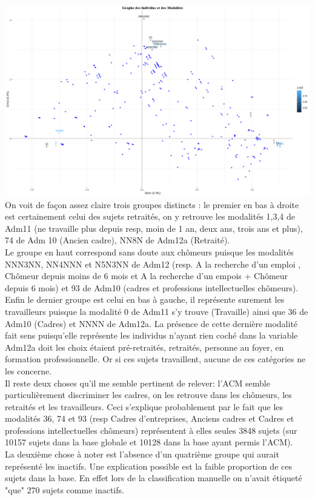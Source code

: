 \documentclass{book}
\begin{document}
\includegraphics[scale = .4]{ACM_var_ind.png}\\

\noindent
On voit de façon assez claire trois groupes distincts : le premier en bas à droite est certainement celui des sujets retraités, on y retrouve les modalités 1,3,4 de Adm11 (ne travaille plus depuis resp, moin de 1 an, deux ans, trois ans et plus), 74 de Adm 10 (Ancien cadre), NN8N de Adm12a (Retraité).\\
\noindent
Le groupe en haut correspond sans doute aux chômeurs puisque les modalités NNN3NN, NN4NNN et N5N3NN de Adm12 (resp. A la recherche d'un emploi , Chômeur depuis moins de 6 mois et A la recherche d'un empois + Chômeur depuis 6 mois) et 93 de Adm10 (cadres et professions intellectuelles chômeurs).\\
Enfin le dernier groupe est celui en bas à gauche, il représente surement les travailleurs puisque la modalité 0 de Adm11 s'y trouve (Travaille) ainsi que 36 de Adm10 (Cadres) et NNNN de Adm12a. La présence de cette dernière modalité fait sens puisqu'elle représente les individus n'ayant rien coché dans la variable Adm12a doit les choix étaient pré-retraités, retraités, personne au foyer, en formation professionnelle. Or si ces sujets travaillent, aucune de ces catégories ne les concerne.\\

\noindent
Il reste deux choses qu'il me semble pertinent de relever: l'ACM semble particulièrement discriminer les cadres, on les retrouve dans les chômeurs, les retraités et les travailleurs. Ceci s'explique probablement par le fait que les modalités 36, 74 et 93 (resp Cadres d'entreprises, Anciens cadres et Cadres et professions intellectuelles chômeurs) représentent à elles seules 3848 sujets (sur 10157 sujets dans la base globale et 10128 dans la base ayant permis l'ACM).\\
La deuxième chose à noter est l'absence d'un quatrième groupe qui aurait représenté les inactifs. Une explication possible est la faible proportion de ces sujets dans la base. En effet lors de la classification manuelle on n'avait étiqueté "que" 270 sujets comme inactifs. \\
\end{document}
